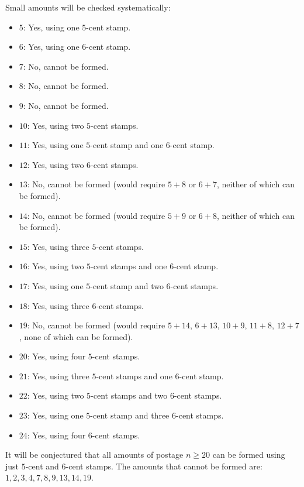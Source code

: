 \begin{enumerate}
\begin{enumerate}
\begin{subprove}
      Small amounts will be checked systematically:
      \begin{itemize}
        \item \(5\): Yes, using one \(5\)-cent stamp.
        \item \(6\): Yes, using one \(6\)-cent stamp.
        \item \(7\): No, cannot be formed.
        \item \(8\): No, cannot be formed.
        \item \(9\): No, cannot be formed.
        \item \(10\): Yes, using two \(5\)-cent stamps.
        \item \(11\): Yes, using one \(5\)-cent stamp and one \(6\)-cent stamp.
        \item \(12\): Yes, using two \(6\)-cent stamps.
        \item \(13\): No, cannot be formed (would require \(5 + 8\) or \(6 + 7\), neither of which can be formed).
        \item \(14\): No, cannot be formed (would require \(5 + 9\) or \(6 + 8\), neither of which can be formed).
        \item \(15\): Yes, using three \(5\)-cent stamps.
        \item \(16\): Yes, using two \(5\)-cent stamps and one \(6\)-cent stamp.
        \item \(17\): Yes, using one \(5\)-cent stamp and two \(6\)-cent stamps.
        \item \(18\): Yes, using three \(6\)-cent stamps.
        \item \(19\): No, cannot be formed (would require \(5 + 14\), \(6 + 13\), \(10 + 9\), \(11 + 8\), \(12 + 7\), none of which can be formed).
        \item \(20\): Yes, using four \(5\)-cent stamps.
        \item \(21\): Yes, using three \(5\)-cent stamps and one \(6\)-cent stamp.
        \item \(22\): Yes, using two \(5\)-cent stamps and two \(6\)-cent stamps.
        \item \(23\): Yes, using one \(5\)-cent stamp and three \(6\)-cent stamps.
        \item \(24\): Yes, using four \(6\)-cent stamps.
      \end{itemize}
      
      It will be conjectured that all amounts of postage \(n \geq 20\) can be formed using just \(5\)-cent and \(6\)-cent stamps.
      The amounts that cannot be formed are: \(1, 2, 3, 4, 7, 8, 9, 13, 14, 19\).
      

\end{subprove}
\end{enumerate}
\end{enumerate}
